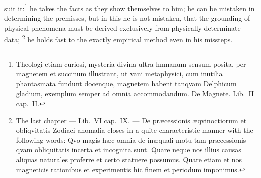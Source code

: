 \documentclass[12pt,a4paper]{book}
\renewcommand{\thefootnote}{*)}
\begin{document}
suit it:\footnote{%
Theologi etiam curiosi, mysteria divina ultra hnmanum sensum posita, per magnetem et succinum illustrant, ut
vani metaphysici, cum inutilia phantasmata fundunt docenque, magnetem habent tanqvam Delphicum gladium,
exemplum semper ad omnia accommodandum. De Magnete. Lib.\ II cap.\ II.} he takes the facts as they show
themselves to him; he can be mistaken in determining the premisses, but in this he is not mistaken, that the
grounding of physical phenomena must be derived exclusively from
physically determinate data;%
\renewcommand{\thefootnote}{**)}%
\footnote{%
The last chapter --- Lib.\ VI cap.\ IX. --- De præcessionis æqvinoctiorum et obliqvitatis Zodiaci anomalia
closes in a quite characteristic manner with the following words: Qvo magis hæc omnia de inæquali motu tam
præcessionis qvam obliquitatis incerta et incognita sunt. Quare neque nos illius causas aliquas naturales
proferre et certo statuere possumus. Quare etiam et nos magneticis rationibus et experimentis hic finem et
periodum imponimus.}%
\renewcommand{\thefootnote}{*)}
he holds fast to the exactly empirical method even in his missteps.
\end{document}

